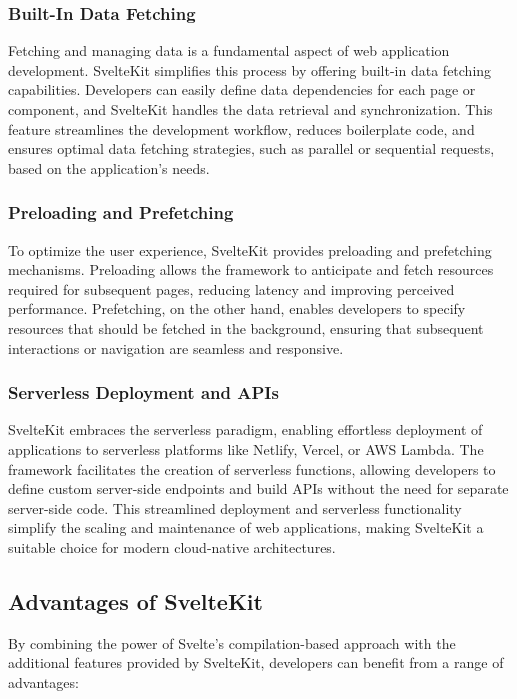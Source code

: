 \subsubsection{Built-In Data Fetching}

Fetching and managing data is a fundamental aspect of web application development. SvelteKit simplifies this process by offering built-in data fetching capabilities. Developers can easily define data dependencies for each page or component, and SvelteKit handles the data retrieval and synchronization. This feature streamlines the development workflow, reduces boilerplate code, and ensures optimal data fetching strategies, such as parallel or sequential requests, based on the application's needs.

\subsubsection{Preloading and Prefetching}

To optimize the user experience, SvelteKit provides preloading and prefetching mechanisms. Preloading allows the framework to anticipate and fetch resources required for subsequent pages, reducing latency and improving perceived performance. Prefetching, on the other hand, enables developers to specify resources that should be fetched in the background, ensuring that subsequent interactions or navigation are seamless and responsive.

\subsubsection{Serverless Deployment and APIs}

SvelteKit embraces the serverless paradigm, enabling effortless deployment of applications to serverless platforms like Netlify, Vercel, or AWS Lambda. The framework facilitates the creation of serverless functions, allowing developers to define custom server-side endpoints and build APIs without the need for separate server-side code. This streamlined deployment and serverless functionality simplify the scaling and maintenance of web applications, making SvelteKit a suitable choice for modern cloud-native architectures.

\subsection{Advantages of SvelteKit}

By combining the power of Svelte's compilation-based approach with the additional features provided by SvelteKit, developers can benefit from a range of advantages:


